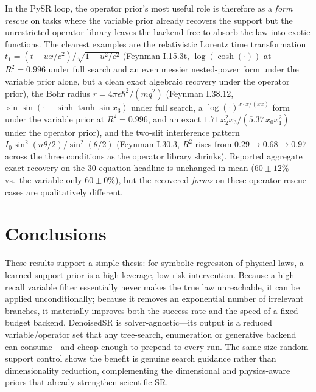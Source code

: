 \documentclass[11pt]{article}
\begin{document}
In the PySR loop, the operator prior's most useful role is therefore as a
\emph{form rescue} on tasks where the variable prior already recovers the
support but the unrestricted operator library leaves the backend free to
absorb the law into exotic functions. The clearest examples are the relativistic
Lorentz time transformation $t_1=(t-ux/c^2)/\sqrt{1-u^2/c^2}$ (Feynman
I.15.3t, $\log(\cosh(\cdot))$ at $R^2{=}0.996$ under full search and an even
messier nested-power form under the variable prior alone, but a clean exact
algebraic recovery under the operator prior), the Bohr radius
$r=4\pi\epsilon\hbar^2/(mq^2)$ (Feynman I.38.12, $\sin\sin(\cdot{-}\sinh
\tanh\sin x_3)$ under full search, a $\log(\cdot)^{x\cdot x/(xx)}$ form under
the variable prior at $R^2{=}0.996$, and an exact $1.71\,x_2^2 x_3/(5.37\,x_0
x_1^2)$ under the operator prior), and the two-slit interference pattern
$I_0\sin^2(n\theta/2)/\sin^2(\theta/2)$ (Feynman I.30.3, $R^2$ rises from
$0.29\to 0.68\to 0.97$ across the three conditions as the operator library
shrinks). Reported aggregate exact recovery on the $30$-equation headline is
unchanged in mean ($60{\pm}12\%$ vs.\ the variable-only $60{\pm}0\%$), but the
recovered \emph{forms} on these operator-rescue cases are qualitatively
different.

\section{Conclusions}
These results support a simple thesis: for symbolic regression of physical laws, a
learned support prior is a high-leverage, low-risk intervention. Because a
high-recall variable filter essentially never makes the true law unreachable, it can
be applied unconditionally; because it removes an exponential number of irrelevant
branches, it materially improves both the success rate and the speed of a
fixed-budget backend. DenoisedSR is solver-agnostic---its output is a reduced
variable/operator set that any tree-search, enumeration or generative
backend\cite{cranmer2023pysr,ruan2026pse,li2026gensr} can consume---and cheap enough
to prepend to every run. The same-size random-support control shows the benefit is
genuine search guidance rather than dimensionality reduction, complementing the
dimensional and physics-aware priors that already strengthen scientific
SR\cite{udrescu2020aifeynman,tenachi2023physo}.
\end{document}
